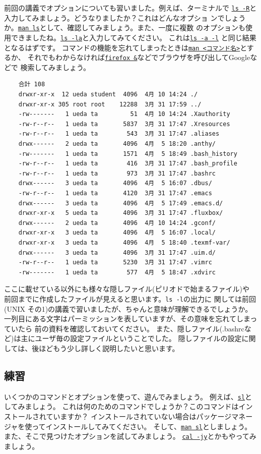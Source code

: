 \documentclass[a4j]{ltjsreport}
\begin{document}
    前回の講義でオプションについても習いました。例えば、ターミナルで
    \underline{\texttt{ls -R}}と入力してみましょう。どうなりましたか？これはどんなオプショ
    ンでしょうか。\underline{\texttt{man ls}}として、確認してみましょう。また、一度に複数
    のオプションも使用できましたね。\underline{\texttt{ls -la}}と入力してみてください。
    これは\underline{\texttt{ls -a -l}} と同じ結果となるはずです。
    コマンドの機能を忘れてしまったときは\underline{\texttt{man <コマンド名>}}とするか、
    それでもわからなければ\underline{\texttt{firefox \&}}などでブラウザを呼び出してGoogleなどで
    検索してみましょう。
    \begin{verbatim}
    合計 108
    drwxr-xr-x  12 ueda student  4096  4月 10 14:24 ./
    drwxr-xr-x 305 root root    12288  3月 31 17:59 ../
    -rw-------   1 ueda ta         51  4月 10 14:24 .Xauthority
    -rw-r--r--   1 ueda ta       5837  3月 31 17:47 .Xresources
    -rw-r--r--   1 ueda ta        543  3月 31 17:47 .aliases
    drwx------   2 ueda ta       4096  4月  5 18:20 .anthy/
    -rw-------   1 ueda ta       1571  4月  5 18:49 .bash_history
    -rw-r--r--   1 ueda ta        416  3月 31 17:47 .bash_profile
    -rw-r--r--   1 ueda ta        973  3月 31 17:47 .bashrc
    drwx------   3 ueda ta       4096  4月  5 16:07 .dbus/
    -rw-r--r--   1 ueda ta       4120  3月 31 17:47 .emacs
    drwx------   3 ueda ta       4096  4月  5 17:49 .emacs.d/
    drwxr-xr-x   5 ueda ta       4096  3月 31 17:47 .fluxbox/
    drwx------   2 ueda ta       4096  4月 10 14:24 .gconf/
    drwxr-xr-x   3 ueda ta       4096  4月  5 16:07 .local/
    drwxr-xr-x   3 ueda ta       4096  4月  5 18:40 .texmf-var/
    drwx------   3 ueda ta       4096  3月 31 17:47 .uim.d/
    -rw-r--r--   1 ueda ta       5230  3月 31 17:47 .vimrc
    -rw-------   1 ueda ta        577  4月  5 18:47 .xdvirc
    \end{verbatim}

    ここに載せている以外にも様々な隠しファイル(ピリオドで始まるファイル)や
    前回までに作成したファイルが見えると思います。\verb+ls -l+の出力に
    関しては前回(UNIX その1)の講義で習いましたが、ちゃんと意味が理解できるでしょうか。
    一列目にある文字はパーミッションを表していますが、その意味を忘れてしまっていたら
    前の資料を確認しておいてください。
    また、隠しファイル(.bashrcなど)は主にユーザ毎の設定ファイルということでした。
    隠しファイルの設定に関しては、後ほどもう少し詳しく説明したいと思います。

    \subsection{練習}
    いくつかのコマンドとオプションを使って、遊んでみましょう。
    例えば、\underline{\texttt{sl}}としてみましょう。
    これは何のためのコマンドでしょうか？このコマンドはインストールされていますか？
    インストールされていない場合はパッケージマネージャを使ってインストールしてみてください。
    そして、\underline{\texttt{man sl}}としましょう。
    また、そこで見つけたオプションを試してみましょう。
    \underline{\texttt{cal -jy}}とかもやってみましょう。
\end{document}
